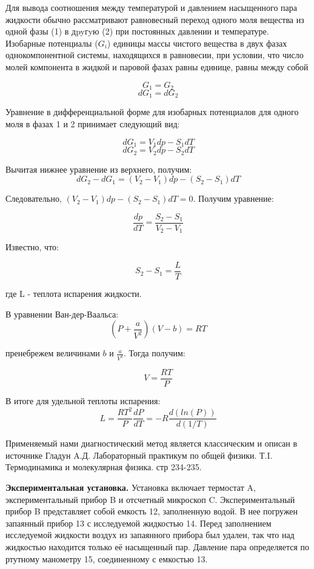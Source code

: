 \documentclass[a4paper,10pt]{article} %
\begin{document}
Для вывода соотношения между температурой и давлением насыщенного пара жидкости обычно рассматривают равновесный переход одного моля вещества из одной фазы (1) в дpyгyю (2) при постоянных давлении и температуре. Изобарные потенциалы ($G_i$) единицы массы чистого вещества в двух фазах однокомпонентной системы, находящихся в равновесии, при условии, что
число молей компонента в жидкой и паровой фазах равны единице, равны между собой

\[G_1 = G_2\]
\[dG_1 = dG_2\]

Уравнение в дифференциальной форме для  изобарных потенциалов для одного моля в фазах 1 и 2 принимает следующий вид:

\[dG_1 = V_1dp - S_1dT\]
\[dG_2 = V_2dp - S_2dT\]

Вычитая нижнее уравнение из верхнего, получим:
\[dG_2 - dG_1 = (V_2-V_1)dp - (S_2-S_1)dT \]

Следовательно, $(V_2-V_1)dp - (S_2 - S_1)dT = 0$.
Получим уравнение:

\[\frac{dp}{dT} = \frac{S_2 - S_1}{V_2-V_1}\]

Известно, что:

\[S_2 - S_1 = \frac{L}{T}\]

где L - теплота испарения жидкости.

В уравнении Ван-дер-Ваальса:
\[(P+\frac{a}{V^2})(V-b) = RT\]

пренебрежем величинами $b$ и $\frac{a}{V^2}$. Тогда получим: 

\[ V = \frac{RT}{P} \]

В итоге для удельной теплоты испарения: 
\[L = \frac{RT^2}{P}\frac{dP}{dT} = -R\frac{d(ln(P))}{d(1/T)}\]



Применяемый нами диагностический метод является классическим и описан в источнике Гладун A.Д. Лабораторный практикум по общей физики. Т.I. Термодинамика и молекулярная физика. стр 234-235.



\medskip

\textbf{Экспериментальная установка.}
Установка включает термостат A, экспериментальный прибор B и отсчетный микроскоп C. Экспериментальный прибор B представляет собой емкость 12, заполненную водой. В нее погружен запаянный прибор 13 с исследуемой жидкостью 14. Перед заполнением исследуемой жидкости воздух
из запаянного прибора был удален, так что над жидкостью находится только её насыщенный пар.
Давление пара определяется по ртутному манометру 15, соединенному с емкостью 13.
\end{document}
